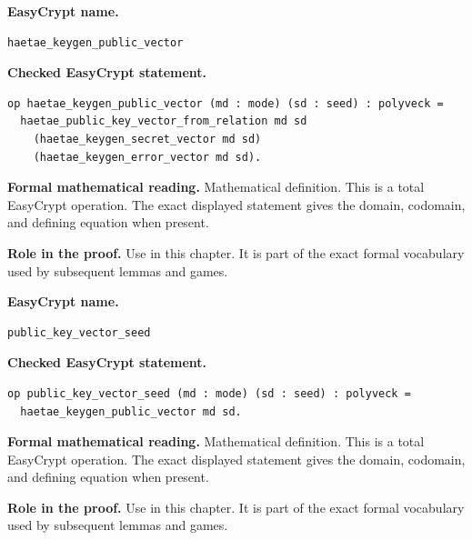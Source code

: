 \begin{formaldefinition}
\noindent\textbf{EasyCrypt name.}
\begin{lstlisting}[language=EasyCrypt,basicstyle=\ttfamily\scriptsize]
haetae_keygen_public_vector
\end{lstlisting}
\noindent\textbf{Checked EasyCrypt statement.}
\begin{lstlisting}[language=EasyCrypt,basicstyle=\ttfamily\scriptsize]
op haetae_keygen_public_vector (md : mode) (sd : seed) : polyveck =
  haetae_public_key_vector_from_relation md sd
    (haetae_keygen_secret_vector md sd)
    (haetae_keygen_error_vector md sd).
\end{lstlisting}
\noindent\textbf{Formal mathematical reading.}
Mathematical definition. This is a total EasyCrypt operation.  The exact displayed statement gives the domain, codomain, and defining equation when present.

\noindent\textbf{Role in the proof.}
Use in this chapter. It is part of the exact formal vocabulary used by subsequent lemmas and games.

\end{formaldefinition}

\begin{formaldefinition}
\noindent\textbf{EasyCrypt name.}
\begin{lstlisting}[language=EasyCrypt,basicstyle=\ttfamily\scriptsize]
public_key_vector_seed
\end{lstlisting}
\noindent\textbf{Checked EasyCrypt statement.}
\begin{lstlisting}[language=EasyCrypt,basicstyle=\ttfamily\scriptsize]
op public_key_vector_seed (md : mode) (sd : seed) : polyveck =
  haetae_keygen_public_vector md sd.
\end{lstlisting}
\noindent\textbf{Formal mathematical reading.}
Mathematical definition. This is a total EasyCrypt operation.  The exact displayed statement gives the domain, codomain, and defining equation when present.

\noindent\textbf{Role in the proof.}
Use in this chapter. It is part of the exact formal vocabulary used by subsequent lemmas and games.

\end{formaldefinition}

